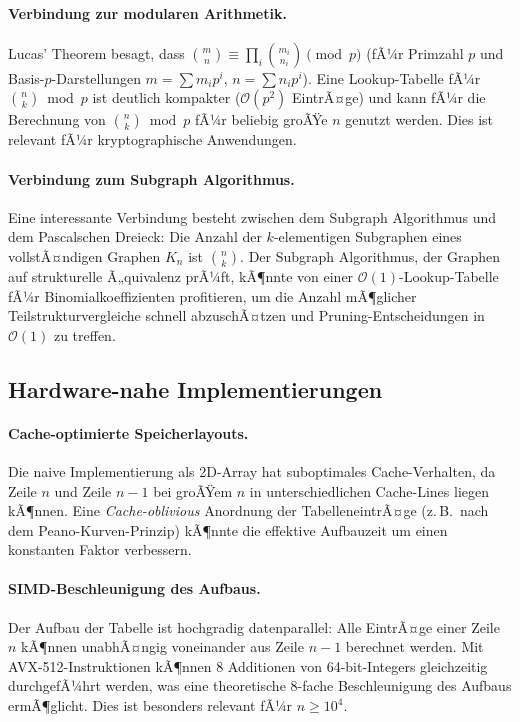 ﻿\documentclass[12pt, a4paper]{article}
\newcommand{\Oh}{\mathcal{O}}
\theoremstyle{plain}
\theoremstyle{definition}
\theoremstyle{remark}
\renewcommand{\Oh}{\mathcal{O}}
\begin{document}
\paragraph{Verbindung zur modularen Arithmetik.}
Lucas' Theorem \cite{lucas1878} besagt, dass
$\binom{m}{n} \equiv \prod_{i} \binom{m_i}{n_i} \pmod{p}$
(fÃ¼r Primzahl $p$ und Basis-$p$-Darstellungen $m = \sum m_i p^i$,
$n = \sum n_i p^i$). Eine Lookup-Tabelle fÃ¼r $\binom{n}{k} \bmod p$
ist deutlich kompakter ($\Oh(p^2)$ EintrÃ¤ge) und kann fÃ¼r die
Berechnung von $\binom{n}{k} \bmod p$ fÃ¼r beliebig groÃŸe $n$
genutzt werden. Dies ist relevant fÃ¼r kryptographische Anwendungen.

\paragraph{Verbindung zum Subgraph Algorithmus.}
Eine interessante Verbindung besteht zwischen dem Subgraph Algorithmus
\cite{epp2026subgraph} und dem Pascalschen Dreieck: Die Anzahl der
$k$-elementigen Subgraphen eines vollstÃ¤ndigen Graphen $K_n$ ist
$\binom{n}{k}$. Der Subgraph Algorithmus, der Graphen auf strukturelle
Ã„quivalenz prÃ¼ft, kÃ¶nnte von einer $\Oh(1)$-Lookup-Tabelle fÃ¼r
Binomialkoeffizienten profitieren, um die Anzahl mÃ¶glicher
Teilstrukturvergleiche schnell abzuschÃ¤tzen und Pruning-Entscheidungen
in $\Oh(1)$ zu treffen.

\subsection{Hardware-nahe Implementierungen}

\paragraph{Cache-optimierte Speicherlayouts.}
Die naive Implementierung als 2D-Array hat suboptimales Cache-Verhalten,
da Zeile $n$ und Zeile $n-1$ bei groÃŸem $n$ in unterschiedlichen
Cache-Lines liegen kÃ¶nnen. Eine \emph{Cache-oblivious} Anordnung der
TabelleneintrÃ¤ge (z.\,B.\ nach dem Peano-Kurven-Prinzip) kÃ¶nnte die
effektive Aufbauzeit um einen konstanten Faktor verbessern.

\paragraph{SIMD-Beschleunigung des Aufbaus.}
Der Aufbau der Tabelle ist hochgradig datenparallel: Alle EintrÃ¤ge
einer Zeile $n$ kÃ¶nnen unabhÃ¤ngig voneinander aus Zeile $n-1$ berechnet
werden. Mit AVX-512-Instruktionen kÃ¶nnen 8 Additionen von 64-bit-Integers
gleichzeitig durchgefÃ¼hrt werden, was eine theoretische 8-fache
Beschleunigung des Aufbaus ermÃ¶glicht. Dies ist besonders relevant fÃ¼r
$n \ge 10^4$.
\end{document}
